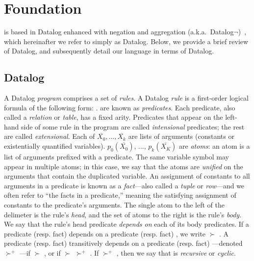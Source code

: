 \section{Foundation}
\label{sec:lang}

\lang is based in Datalog enhanced with negation and aggregation
(a.k.a.\ Datalog$\lnot$)~\cite{ullmanbook}, which hereinafter we refer to simply as Datalog.
Below, we provide a brief review of Datalog, and subsequently detail our
language in terms of Datalog.

\subsection{Datalog}
\label{sec:datalog}

A Datalog {\em program} comprises a set of {\em rules}.  A Datalog {\em rule}
is a first-order logical formula of the following form:
.   are known as {\em
predicates}.  Each predicate, also called a {\em relation} or {\em table}, has
a fixed arity.  Predicates that appear on the left-hand side of some rule in
the program are called {\em intensional} predicates; the rest are called {\em
extensional}.  Each of $\overline{X_0}, ..., \overline{X_k}$ are lists of
arguments (constants or existentially quantified variables).
$p_0(\overline{X_0})$, ..., $p_k(\overline{X_K})$ are {\em atoms}: an atom is
a list of arguments prefixed with a predicate.  The same variable symbol may
appear in multiple atoms; in this case, we say that the atoms are {\em
unified} on the arguments that contain the duplicated variable.  An assignment of constants to all arguments in a predicate is known as a {\em
fact}---also called a {\em tuple} or {\em row}---and we often refer to ``the
facts in a predicate,'' meaning the satisfying assignment of constants to the
predicate's arguments.  The single
atom to the left of the \dedalus{:-} delimeter is the rule's {\em head}, and
the set of atoms to the right is the rule's {\em body}.  We say that the rule's
head predicate {\em depends on} each of its body predicates.   If a predicate
(resp. fact)  depends on a predicate (resp. fact) , we
write  $\succ$ .  A predicate (resp. fact)  transitively depends on a predicate (resp. fact) ---denoted
 $\succ^+$ ---if  $\succ$ , or if
 $\succ$  $\succ^+$ .  If 
$\succ^+$ , then we say that  is {\em recursive} or {\em
cyclic}.


